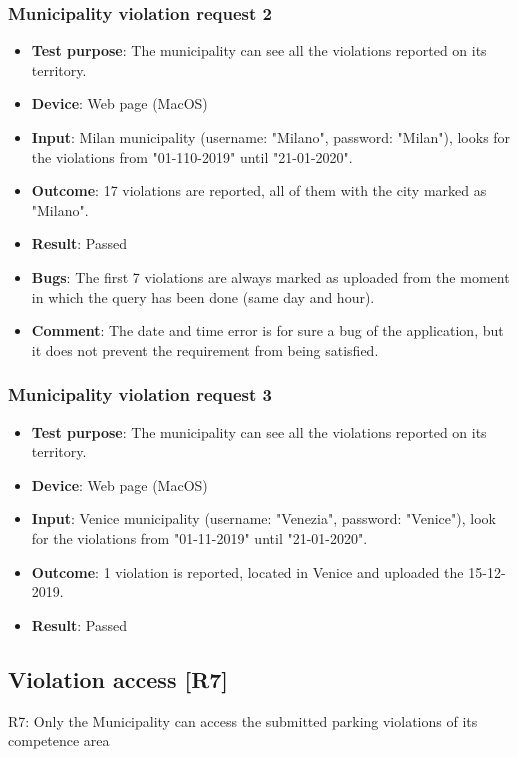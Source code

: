 \documentclass[../ATD.tex]{subfiles}
\begin{document}
    \subsubsection{Municipality violation request 2}\label{subsubsec:municiplaity-violation-request-2}
    \begin{itemize}
        \item \textbf{Test purpose}: The municipality can see all the violations reported on its territory.
        \item \textbf{Device}: Web page (MacOS)
        \item \textbf{Input}: Milan municipality (username: "Milano", password: "Milan"), looks for the violations from "01-110-2019" until "21-01-2020".
        \item \textbf{Outcome}: 17 violations are reported, all of them with the city marked as "Milano".
        \item \textbf{Result}: Passed
        \item \textbf{Bugs}: The first 7 violations are always marked as uploaded from the moment in which the query has been done (same day and hour).
        \item \textbf{Comment}: The date and time error is for sure a bug of the application, but it does not prevent the requirement from being satisfied.
    \end{itemize}

    \subsubsection{Municipality violation request 3}\label{subsubsec:municiplaity-violation-request-3}
    \begin{itemize}
        \item \textbf{Test purpose}: The municipality can see all the violations reported on its territory.
        \item \textbf{Device}: Web page (MacOS)
        \item \textbf{Input}: Venice municipality (username: "Venezia", password: "Venice"), look for the violations from "01-11-2019" until "21-01-2020".
        \item \textbf{Outcome}: 1 violation is reported, located in Venice and uploaded the 15-12-2019.
        \item \textbf{Result}: Passed
    \end{itemize}

    \subsection{Violation access [R7]}\label{subsec:violation-access-1}
    R7: Only the Municipality can access the submitted parking violations of its competence area
\end{document}

